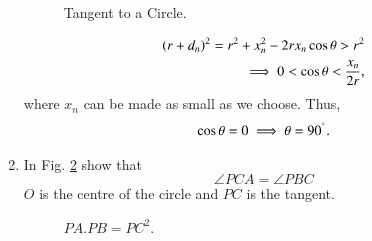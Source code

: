 \begin{enumerate}[label=\arabic*.,ref=\thesubsection.\theenumi]
\begin{figure}[!ht]
\begin{center}
		\resizebox{\columnwidth}{!}{}
	\end{center}
	\caption{Tangent to a Circle.}
	\label{ch4_tangent_def}	
\end{figure}
%
%		

%
\begin{align}
\left(r+d_n\right)^2 = r^2 + x_n^2 - 2rx_n\cos\theta > r^2 
\\
\implies  0 <\cos\theta < \frac{x_n}{2r},
\end{align}
%
where $x_n$ can be made as small as we choose.  Thus, 
%
\begin{align}
\cos \theta = 0 \implies \theta  = 90 ^{\degree}.
\end{align}

%
\item
In Fig. \ref{ch4_tangent_prod} show that 
%
\begin{equation}
\angle PCA = \angle PBC
\end{equation}
%
$O$ is the centre of the circle and $PC$ is the tangent.

	\begin{figure}[!ht]
		\begin{center}
			
			\resizebox{\columnwidth}{!}{}
		\end{center}
		\caption{$PA.PB = PC^2$.}
		\label{ch4_tangent_prod}	
	\end{figure}


\end{enumerate}
